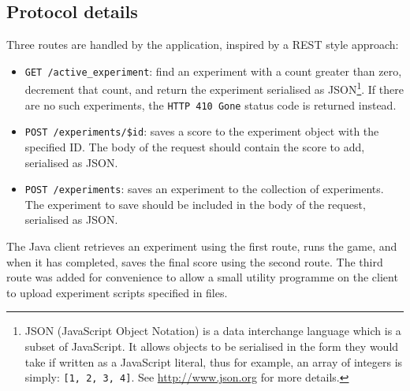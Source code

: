 \subsection{Protocol details}

Three routes are handled by the application, inspired by a REST style approach:

\begin{itemize}
\item {\tt GET /active\_experiment}: find an experiment with a count greater than zero, decrement that count, and return the experiment serialised as JSON\footnote{JSON (JavaScript Object Notation) is a data interchange language which is a subset of JavaScript.  It allows objects to be serialised in the form they would take if written as a JavaScript literal, thus for example, an array of integers is simply: {\tt [1, 2, 3, 4]}.  See \url{http://www.json.org} for more details.}.  If there are no such experiments, the {\tt HTTP 410 Gone} status code is returned instead.
\item {\tt POST /experiments/\$id}: saves a score to the experiment object with the specified ID.  The body of the request should contain the score to add, serialised as JSON.
\item {\tt POST /experiments}: saves an experiment to the collection of experiments.  The experiment to save should be included in the body of the request, serialised as JSON.
\end{itemize}

The Java client retrieves an experiment using the first route, runs the game, and when it has completed, saves the final score using the second route.  The third route was added for convenience to allow a small utility programme on the client to upload experiment scripts specified in files.



